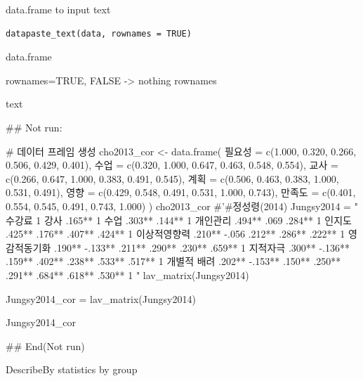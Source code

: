 \documentclass[a4paper]{book}
\begin{document}
%
\begin{Description}
data.frame to input text
\end{Description}
%
\begin{Usage}
\begin{verbatim}
datapaste_text(data, rownames = TRUE)
\end{verbatim}
\end{Usage}
%
\begin{Arguments}
\begin{ldescription}
\item[\code{data}] data.frame

\item[\code{rownames}] rownames=TRUE, FALSE -> nothing rownames
\end{ldescription}
\end{Arguments}
%
\begin{Value}
text
\end{Value}
%
\begin{Examples}
\begin{ExampleCode}

## Not run: 

# 데이터 프레임 생성
cho2013_cor <- data.frame(
  필요성 = c(1.000, 0.320, 0.266, 0.506, 0.429, 0.401),
  수업 = c(0.320, 1.000, 0.647, 0.463, 0.548, 0.554),
  교사 = c(0.266, 0.647, 1.000, 0.383, 0.491, 0.545),
  계획 = c(0.506, 0.463, 0.383, 1.000, 0.531, 0.491),
  영향 = c(0.429, 0.548, 0.491, 0.531, 1.000, 0.743),
  만족도 = c(0.401, 0.554, 0.545, 0.491, 0.743, 1.000)
)
cho2013_cor %
#'#정성령(2014)
Jungsy2014 = "
수강료 1
강사 .165** 1
수업 .303** .144** 1
개인관리 .494** .069 .284** 1
인지도 .425** .176** .407** .424** 1
이상적영향력 .210** -.056 .212** .286** .222** 1
영감적동기화 .190** -.133** .211** .290** .230** .659** 1
지적자극 .300** -.136** .159** .402** .238** .533** .517** 1
개별적 배려 .202** -.153** .150** .250** .291** .684** .618** .530** 1
"
lav_matrix(Jungsy2014)

Jungsy2014_cor = lav_matrix(Jungsy2014)

Jungsy2014_cor %

## End(Not run)

\end{ExampleCode}
\end{Examples}
%
\begin{Description}
DescribeBy  statistics by group
\end{Description}
\end{document}
